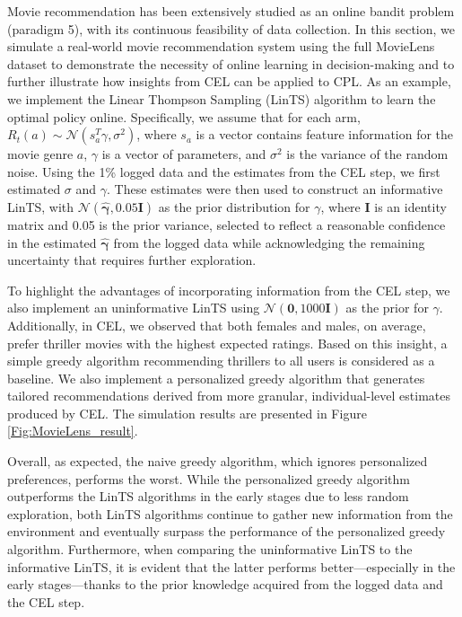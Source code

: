 Movie recommendation has been extensively studied as an online bandit problem (paradigm 5), with its continuous feasibility of data collection. In this section, we simulate a real-world movie recommendation system using the full MovieLens dataset to demonstrate the necessity of online learning in decision-making and to further illustrate how insights from \acrshort{CEL} can be applied to \acrshort{CPL}. As an example, we implement the Linear Thompson Sampling (LinTS) algorithm to learn the optimal policy online. Specifically, we assume that for each arm, $R_t(a)\sim\mathcal{N}(s_a^T\gamma, \sigma^2)$, where $s_a$ is a vector contains feature information for the movie genre $a$, $\gamma$ is a vector of parameters, and $\sigma^2$ is the variance of the random noise. Using the 1\% logged data and the estimates from the \acrshort{CEL} step, we first estimated $\sigma$ and $\gamma$. These estimates were then used to construct an informative LinTS, with $\mathcal{N}(\hat{\boldsymbol{\gamma}}, 0.05\boldsymbol{I})$ as the prior distribution for $\gamma$, where $\boldsymbol{I}$ is an identity matrix and 0.05 is the prior variance, selected to reflect a reasonable confidence in the estimated $\hat{\boldsymbol{\gamma}}$ from the logged data while acknowledging the remaining uncertainty that requires further exploration. 

To highlight the advantages of incorporating information from the \acrshort{CEL} step, we also implement an uninformative LinTS using $\mathcal{N}(\boldsymbol{0},1000\boldsymbol{I})$ as the prior for $\gamma$. Additionally, in \acrshort{CEL}, we observed that both females and males, on average, prefer thriller movies with the highest expected ratings. Based on this insight, a simple greedy algorithm recommending thrillers to all users is considered as a baseline. We also implement a personalized greedy algorithm that generates tailored recommendations derived from more granular, individual-level estimates produced by \acrshort{CEL}. The simulation results are presented in Figure \ref{Fig:MovieLens_result}.

Overall, as expected, the naive greedy algorithm, which ignores personalized preferences, performs the worst. While the personalized greedy algorithm outperforms the LinTS algorithms in the early stages due to less random exploration, both LinTS algorithms continue to gather new information from the environment and eventually surpass the performance of the personalized greedy algorithm. Furthermore, when comparing the uninformative LinTS to the informative LinTS, it is evident that the latter performs better—especially in the early stages—thanks to the prior knowledge acquired from the logged data and the \acrshort{CEL} step.

